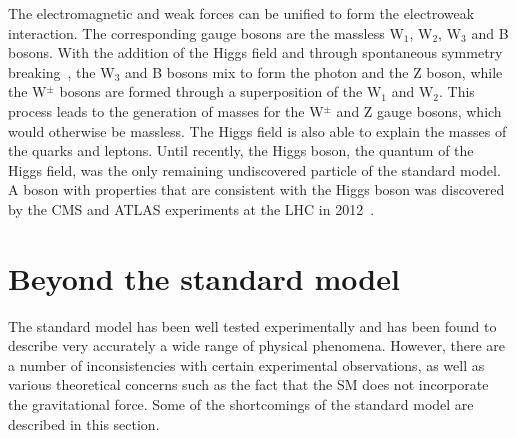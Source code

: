 The electromagnetic and weak forces can be unified to form the electroweak 
interaction. The corresponding gauge bosons are the massless W$_1$, W$_2$, 
W$_3$ and B bosons. With the addition of the Higgs field and through 
spontaneous symmetry breaking~\cite{higgsmech1,higgsmech2,higgsmech3}, the 
W$_3$ and B bosons mix to form the photon 
and the Z boson, while the W$^{\pm}$ bosons are formed through a superposition 
of the W$_1$ and W$_2$. This process leads to the generation of masses for the 
W$^{\pm}$ and Z gauge bosons, which would otherwise be massless. The Higgs 
field is also able to explain the masses of the quarks and leptons. 
Until recently, the Higgs boson, the quantum of the Higgs field, was the only 
remaining undiscovered particle of the standard model. A boson with properties 
that are consistent with the Higgs boson was discovered by the CMS and ATLAS 
experiments at the LHC in 2012~\cite{higgs-cms,higgs-atlas}.

\section{Beyond the standard model}
\label{sec:theory-bsm}
The standard model has been well tested experimentally and has been found to 
describe very accurately a wide range of physical phenomena. However, there are 
a number of inconsistencies with certain experimental observations, as well as 
various theoretical concerns such as the fact that the SM does not incorporate 
the gravitational force. Some of the shortcomings of the standard model are 
described in this section.


